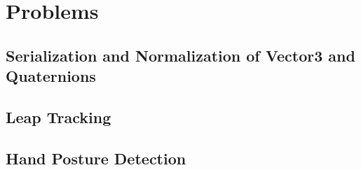 \section{Problems}

\subsection{Serialization and Normalization of Vector3 and Quaternions}

\subsection{Leap Tracking}

\subsection{Hand Posture Detection}


